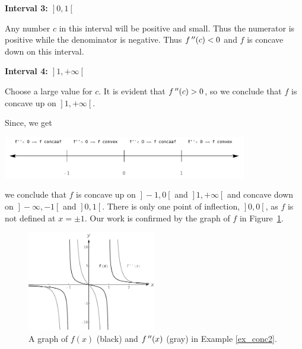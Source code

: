 \begin{example}
\begin{description}
\item\textbf{Interval 3: $\left.\right]0,1\left[\right.$} 

Any number $c$ in this interval will be positive and small. Thus the numerator is positive while the denominator is negative. Thus $f\,''(c)<0$ and $f$ is concave down on this interval.

\item\textbf{Interval 4: $\left.\right]1,+\infty\left[\right.$} 

Choose a large value for $c$. It is evident that $f\,''(c)>0$, so we conclude that $f$ is concave up on $\left.\right]1,+\infty\left[\right.$.

\end{description}
Since, we get
	\begin{center}
			\includegraphics[width=0.8\textwidth]{fig_behaviour_18}
	\end{center}
	
we conclude that $f$ is concave up on $\left.\right]-1,0\left[\right.$ and $\left.\right]1,+\infty\left[\right.$ and concave down on $\left.\right]-\infty,-1\left[\right.$ and $\left.\right]0,1\left[\right.$. There is only one point of inflection, $\left.\right]0,0\left[\right.$, as $f$ is not defined at $x=\pm 1$. Our work is confirmed by the graph of $f$ in Figure~\ref{fig_behaviour_19}. 


\begin{figure}[H]
	\begin{center}
			\includegraphics[width=0.5\textwidth]{fig_behaviour_19}
	\caption{A graph of $f(x)$ (black) and $f\,''(x)$ (gray) in Example \ref{ex_conc2}.}
	\label{fig_behaviour_19}
	\end{center}
\end{figure}


\end{example}


